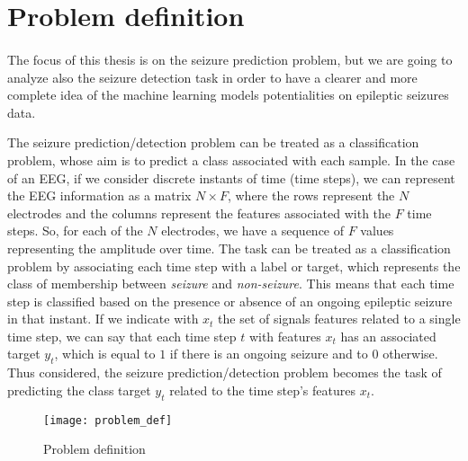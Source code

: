 
\section{Problem definition} \label{sec: problem_definition}
\paragraph{} The focus of this thesis is on the seizure prediction problem, but we are going to analyze also the seizure detection task in order to have a clearer and more complete idea of the machine learning models potentialities on epileptic seizures data.

The seizure prediction/detection problem can be treated as a classification problem, whose aim is to predict a class associated with each sample. In the case of an EEG, if we consider discrete instants of time (time steps), we can represent the EEG information as a matrix $N \times F$, where the rows represent the $N$ electrodes and the columns represent the features associated with the $F$ time steps. So, for each of the $N$ electrodes, we have a sequence of $F$ values representing the amplitude over time. The task can be treated as a classification problem by associating each time step with a label or target, which represents the class of membership between \textit{seizure} and \textit{non-seizure}. This means that each time step is classified based on the presence or absence of an ongoing epileptic seizure in that instant. If we indicate with $x_t$ the set of signals features related to a single time step, we can say that each time step $t$ with features $x_t$ has an associated target $y_t$, which is equal to $1$ if there is an ongoing seizure and to $0$ otherwise. Thus considered, the seizure prediction/detection problem becomes the task of predicting the class target $y_t$ related to the time step's features $x_t$.

\begin{figure}[htbp]
    \centering
    \texttt{[image: problem\_def]}
    \caption{Problem definition}
    \label{fig:problem_def}
\end{figure}

